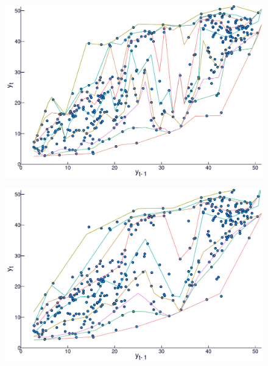 \begin{figure}[htp]
  \centering
  \begin{minipage}[t]{0.4\linewidth}
    \centering
    \begin{minipage}[t]{\linewidth}
      \centering     \includegraphics[width=\textwidth]{Images/icaraizinho-crossing-01}
	  \label{fig:nonlinear1}
    \end{minipage}
    \begin{minipage}[b]{\linewidth}
      \centering     \includegraphics[width=\textwidth]{Images/icaraizinho-crossing-03}
    \end{minipage}
     \begin{minipage}[b]{\linewidth}

\end{minipage}
\end{minipage}
\end{figure}
